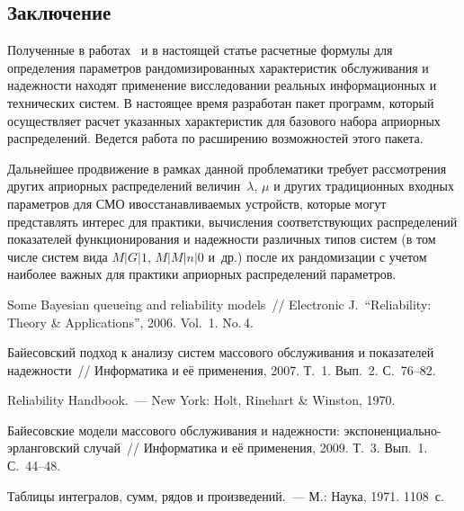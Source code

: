 \begin{multicols}{2}
\vspace*{-24pt}
\section{Заключение}

\vspace*{-1pt}

Полученные в работах~\cite{1kud, 2kud, 4kud} и в настоящей статье расчетные формулы для определения параметров рандомизированных
характеристик обслуживания и надежности находят применение в\linebreak исследовании реальных информационных и технических систем.
В настоящее время разработан пакет программ, который осуществляет расчет указанных характеристик для базового набора
априорных распределений. Ведется работа по расширению возможностей этого пакета.

Дальнейшее продвижение в рамках данной проб\-ле\-ма\-ти\-ки требует рассмотрения других
 априорных распределений величин~$\lambda$, 
$\mu$ и других тра\-ди\-ционных входных параметров для СМО и\linebreak вос\-ста\-нав\-ли\-ва\-емых устройств, которые могут
представлять интерес для практики, вычисления со\-от\-вет\-ст\-ву\-ющих распределений показателей функционирования и надежности
различных типов систем (в том числе систем вида $M\vert G\vert 1$, $M\vert M\vert n\vert 0$ и~др.) 
после их рандомизации с учетом наиболее важных для практики априорных распределений параметров.

\vspace*{-12pt}

{\small\frenchspacing
{\baselineskip=10pt
\begin{thebibliography}{9}    
\vspace*{-1pt}

Some Bayesian queueing and reliability models~// 
Electronic J.\ ``Reliability: Theory \& Applications'', 2006. Vol.~1. No.\,4.

Байесовский подход к анализу систем массового обслуживания и показателей надежности~// 
Информатика и её применения, 2007. Т.~1. Вып.~2. С.~76--82.

Reliability Handbook.~--- New York: Holt, Rinehart \& Winston, 1970.

Байесовские модели массового обслуживания и надежности: экспо\-нен\-ци\-аль\-но-эр\-лан\-гов\-ский случай~// 
Информатика и её применения, 2009. Т.~3. Вып.~1. С.~44--48.



Таблицы интегралов, сумм, рядов и произведений.~--- М.: Наука, 1971. 1108~с.

\label{end\stat}
 \end{thebibliography}
}
}
\end{multicols}